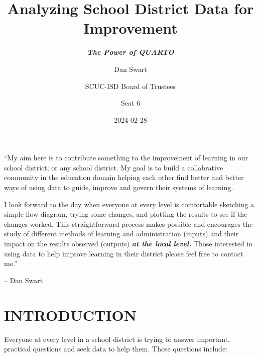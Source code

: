 \documentclass[
  letterpaper,
  DIV=11,
  numbers=noendperiod]{scrartcl}
\title{Analyzing School District Data for Improvement}
\subtitle{\textbf{\emph{The Power of QUARTO}}}
\author{Dan Swart \and SCUC-ISD Board of Trustees \and Seat 6}
\date{2024-02-28}
\begin{document}
\maketitle

\Large

\begin{tcolorbox}[enhanced jigsaw, leftrule=.75mm, breakable, bottomrule=.15mm, opacityback=0, colframe=quarto-callout-tip-color-frame, arc=.35mm, colback=white, rightrule=.15mm, left=2mm, toprule=.15mm]

``My aim here is to contribute something to the improvement of learning
in our school district; or any school district. My goal is to build a
collabrative community in the education domain helping each other find
better and better ways of using data to guide, improve and govern their
systems of learning.

I look forward to the day when everyone at every level is comfortable
sketching a simple flow diagram, trying some changes, and plotting the
results to see if the changes worked. This straightforward process makes
possible and encourages the study of different methods of learning and
administration (inputs) and their impact on the results observed
(outputs) \textbf{\emph{at the local level.}} Those interested in using
data to help improve learning in their district please feel free to
contact me.'' \bigskip

-- Dan Swart

\end{tcolorbox}

\vspace{0.3in}

\section{\texorpdfstring{\textbf{INTRODUCTION}}{INTRODUCTION}}\label{introduction}

Everyone at every level in a school district is trying to answer
important, practical questions and seek data to help them. Those
questions include:
\end{document}
